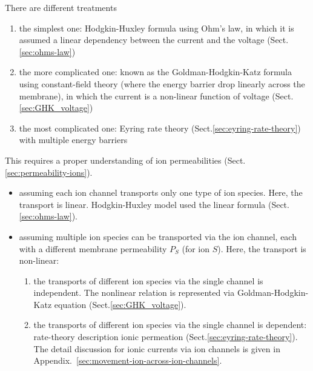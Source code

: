 There are different treatments
\begin{enumerate}
  \item the simplest one: Hodgkin-Huxley formula using Ohm's law, in which it is
  assumed a linear dependency between the current and the voltage
  (Sect.\ref{sec:ohms-law})

  \item the more complicated one: known as the Goldman-Hodgkin-Katz formula
  using constant-field theory (where the energy barrier drop linearly across the
  membrane), in which the current is a non-linear function of voltage
  (Sect.\ref{sec:GHK_voltage})

  \item the most complicated one: Eyring rate theory (Sect.\ref{sec:eyring-rate-theory})
  with multiple energy barriers
\end{enumerate}


This requires a proper understanding of ion permeabilities
(Sect.\ref{sec:permeability-ions}).
\begin{itemize}
  \item assuming each ion channel transports only one type of ion species.
  Here, the transport is linear. Hodgkin-Huxley model used the linear formula
    (Sect.\ref{sec:ohms-law}).


  \item assuming multiple ion species can be transported via the ion channel,
  each with a different membrane permeability $P_S$ (for ion $S$).
  Here,  the transport is non-linear:
  \begin{enumerate}
    \item the transports of different ion species via the single channel is
    independent. The nonlinear relation is represented via
    Goldman-Hodgkin-Katz equation
(Sect.\ref{sec:GHK_voltage}).


    \item the transports of different ion species via the single channel is
    dependent: rate-theory description ionic permeation
    (Sect.\ref{sec:eyring-rate-theory}). The detail discussion for ionic
    currents via ion channels is given in Appendix.~\ref{sec:movement-ion-across-ion-channels}.

  \end{enumerate}

\end{itemize}


